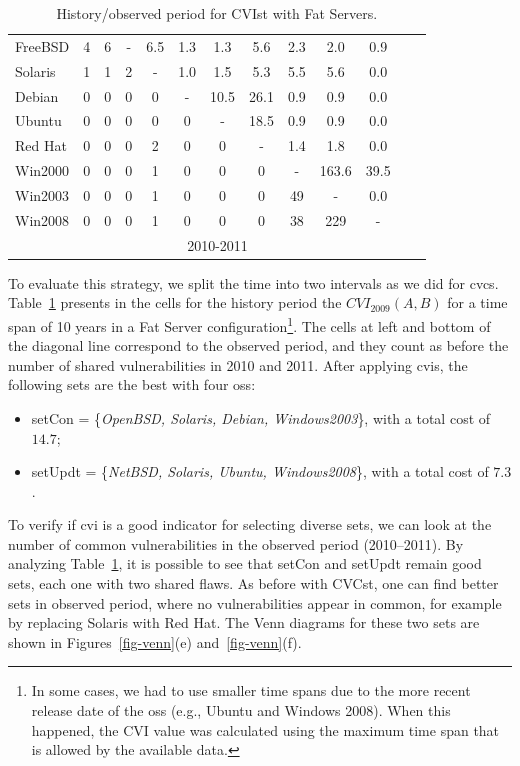 \begin{table}[!ht]
\begin{center}
{\begin{tabular}{|l|c|c|c|c|c|c|c|c|c|c|c|c|}
FreeBSD & 4 & 6 & - & 6.5 & 1.3 & 1.3 & 5.6 & 2.3 & 2.0 & 0.9&\\ \cline{1-11}
Solaris & 1 & 1 & 2 & - & 1.0 & 1.5 & 5.3 & 5.5 & 5.6 & 0.0&\\ \cline{1-11}
Debian & 0 & 0 & 0 & 0 & - & 10.5 & 26.1 & 0.9 & 0.9 & 0.0&\\ \cline{1-11}
Ubuntu & 0 & 0 & 0 & 0 & 0 & - & 18.5 & 0.9 & 0.9 & 0.0&\\ \cline{1-11}
Red Hat & 0 & 0 & 0 & 2 & 0 & 0 &  - & 1.4 & 1.8 & 0.0&\\ \cline{1-11}
Win2000 & 0 & 0 & 0 & 1 & 0 & 0 & 0 & - & 163.6 & 39.5&\\ \cline{1-11}
Win2003 & 0 & 0 & 0 & 1 & 0 & 0 & 0 & 49 & - & 0.0 &\\ \cline{1-12}
Win2008 & 0 & 0 & 0 & 1 & 0 & 0 & 0 & 38 & 229 & - &\multicolumn{1}{|c}{}  \\ \cline{1-11}
 \multicolumn{1}{c|}{}& \multicolumn{9}{|c|}{2010-2011} & \multicolumn{2}{|c}{}\\ \cline{2-10}
\end{tabular}
\caption{History/observed period for CVIst with Fat Servers.}
\label{tab:strat_ii}
}
\end{center}
\end{table}

To evaluate this strategy, we split the time into two intervals as we did for \gls{cvcs}. 
Table~\ref{tab:strat_ii} presents in the cells for the history period the $\mathit{CVI}_{2009}(A,B)$ for a time span of 10 years in a Fat Server configuration\footnote{In some cases, we had to use smaller time spans due to the more recent release date of the \glspl{os} (e.g., Ubuntu and Windows 2008). When this happened, the CVI value was calculated using the maximum time span that is allowed by the available data.}. 
The cells at left and bottom of the diagonal line correspond to the observed period, and they count as before the number of shared vulnerabilities in 2010 and 2011. After applying \gls{cvis}, the following sets are the best with four \glspl{os}:

\begin{itemize}
\item setCon = \{\emph{OpenBSD, Solaris, Debian, Windows2003}\}, with a total cost of $14.7$;
\item setUpdt = \{\emph{NetBSD, Solaris, Ubuntu, Windows2008}\}, with a total cost of $7.3$.
\end{itemize}

To verify if \gls{cvi} is a good indicator for selecting diverse sets, we can look at the number of common vulnerabilities in the observed period (2010--2011). 
By analyzing Table~\ref{tab:strat_ii}, it is possible to see that setCon and setUpdt remain good sets, each one with two shared flaws. 
As before with CVCst, one can find better sets in observed period, where no vulnerabilities appear in common, for example by replacing Solaris with Red Hat.
The Venn diagrams for these two sets are shown in Figures~\ref{fig-venn}(e) and~\ref{fig-venn}(f).

